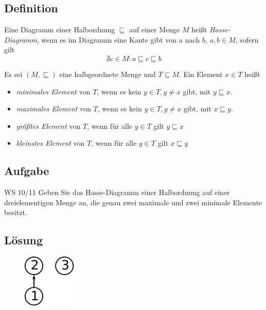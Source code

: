 \subsection{Definition}
\begin{frame}
	\begin{Definition}
		Eine Diagramm einer Halbordnung $\sqsubseteq$ auf einer Menge $M$ heißt \emph{Hasse-Diagramm}, wenn es im Diagramm eine Kante gibt von $a$ nach $b$, $a,b\in M$, sofern gilt $$ \nexists c\in M : a\sqsubseteq c \sqsubseteq b $$
	\end{Definition} \pause
	
	\begin{Definition}
		Es sei $(M,\sqsubseteq)$ eine halbgeordnete Menge und $T\subseteq M$. Ein Element $x\in T$ heißt 
		\begin{itemize}
			\item \emph{minimales Element} von $T$, wenn es kein $y\in T, y\neq x$ gibt, mit $y\sqsubseteq x$.
			\item \emph{maximales Element} von $T$, wenn es kein $y\in T, y\neq x$ gibt, mit $x\sqsubseteq y$.
			\item \emph{größtes Element} von $T$, wenn für alle $y\in T$ gilt $y\sqsubseteq x$
			\item \emph{kleinstes Element} von $T$, wenn für alle $y\in T$ gilt $x\sqsubseteq y$
		\end{itemize}
	
	\end{Definition}
\end{frame}




\subsection{Aufgabe}
\begin{frame}{WS 10/11}
	Geben Sie das Hasse-Diagramm einer Halbordnung auf einer dreielementigen Menge an, die genau zwei maximale und zwei minimale Elemente besitzt.
\end{frame}
\subsection{Lösung}
\begin{frame}
	\begin{figure}[H]
		\centering
		\includegraphics[scale=0.7]{../figures/halbordnungen/Loesung.pdf}
	\end{figure}
\end{frame}